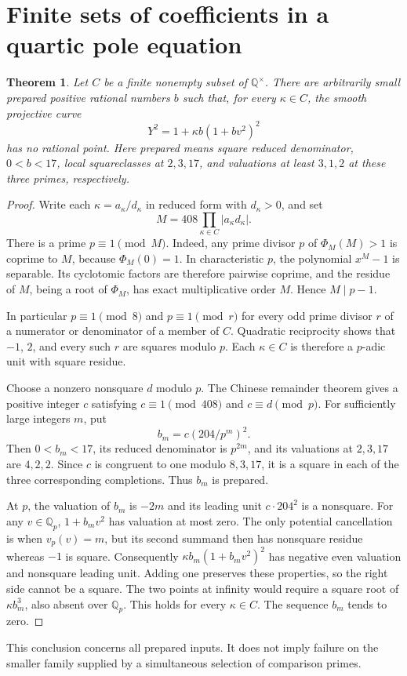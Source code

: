 \documentclass[11pt]{article}
\newtheorem{theorem}{Theorem}
\begin{document}
\section*{Finite sets of coefficients in a quartic pole equation}
\begin{theorem}
Let $C$ be a finite nonempty subset of $\mathbb Q^\times$.
There are arbitrarily small prepared positive rational numbers $b$
such that, for every $\kappa\in C$, the smooth projective curve
\[
                  Y^2=1+\kappa b(1+bv^2)^2
\]
has no rational point. Here prepared means square reduced denominator,
$0<b<17$, local squareclasses at $2,3,17$, and valuations at least
$3,1,2$ at these three primes, respectively.
\end{theorem}
\begin{proof}
Write each $\kappa=a_\kappa/d_\kappa$ in reduced form with
$d_\kappa>0$, and set
\[
             M=408\prod_{\kappa\in C}|a_\kappa d_\kappa|.
\]
There is a prime $p\equiv1\pmod M$. Indeed, any prime divisor
$p$ of $\Phi_M(M)>1$ is coprime to $M$, because
$\Phi_M(0)=1$. In characteristic $p$, the polynomial $x^M-1$
is separable. Its cyclotomic factors are therefore pairwise coprime,
and the residue of $M$, being a root of $\Phi_M$, has exact
multiplicative order $M$. Hence $M\mid p-1$.

In particular $p\equiv1\pmod8$ and $p\equiv1\pmod r$ for
every odd prime divisor $r$ of a numerator or denominator of a
member of $C$. Quadratic reciprocity shows that $-1$, $2$, and
every such $r$ are squares modulo $p$. Each $\kappa\in C$ is
therefore a $p$-adic unit with square residue.

Choose a nonzero nonsquare $d$ modulo $p$. The Chinese remainder
theorem gives a positive integer $c$ satisfying
$c\equiv1\pmod{408}$ and $c\equiv d\pmod p$.
For sufficiently large integers $m$, put
\[
                         b_m=c(204/p^m)^2.
\]
Then $0<b_m<17$, its reduced denominator is $p^{2m}$, and
its valuations at $2,3,17$ are $4,2,2$. Since $c$ is congruent
to one modulo $8,3,17$, it is a square in each of the three
corresponding completions. Thus $b_m$ is prepared.

At $p$, the valuation of $b_m$ is $-2m$ and its leading unit
$c\cdot204^2$ is a nonsquare. For any $v\in\mathbb Q_p$,
$1+b_mv^2$ has valuation at most zero. The only potential
cancellation is when $v_p(v)=m$, but its second summand then
has nonsquare residue whereas $-1$ is square. Consequently
$\kappa b_m(1+b_mv^2)^2$ has negative even valuation and
nonsquare leading unit. Adding one preserves these properties,
so the right side cannot be a square. The two points at infinity
would require a square root of $\kappa b_m^3$, also absent
over $\mathbb Q_p$. This holds for every $\kappa\in C$.
The sequence $b_m$ tends to zero.
\end{proof}
This conclusion concerns all prepared inputs. It does not imply
failure on the smaller family supplied by a simultaneous selection
of comparison primes.
\end{document}
